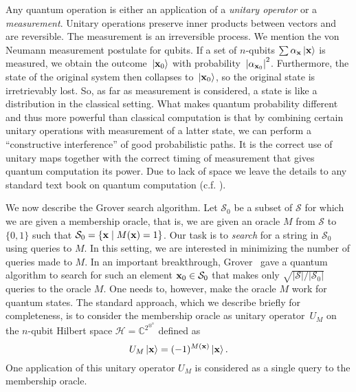 \documentclass[a4paper,11pt]{article}
\begin{document}
Any quantum operation is either an application of a \emph{unitary
  operator} or a \emph{measurement}. Unitary operations preserve inner
products between vectors and are reversible. The measurement is an
irreversible process. We mention the von Neumann measurement postulate
for qubits. If a set of $n$-qubits $\sum \alpha_{\xvec} \ket{\xvec}$
is measured, we obtain the outcome~$\ket{\xvec_0}$ with
probability~$\abs{\alpha_{\xvec_0}}^2$. Furthermore, the state of the
original system then collapses to~$\ket{\xvec_0}$, so the original
state is irretrievably lost. So, as far as measurement is considered,
a state is like a distribution in the classical setting. What makes
quantum probability different and thus more powerful than classical
computation is that by combining certain unitary operations with
measurement of a latter state, we can perform a ``constructive
interference'' of good probabilistic paths. It is the correct use of
unitary maps together with the correct timing of measurement that
gives quantum computation its power. Due to lack of space we leave the
details to any standard text book on quantum computation
(c.f. \cite{nielsenchuang:book}).

We now describe the Grover search algorithm. Let $\mathcal{S}_0$ be a subset of $\mathcal{S}$ for which we are given a membership oracle, that is, we are given an oracle $M$ from $\mathcal{S}$ to $\{ 0 , 1 \}$ such that $\mathcal{S}_0 = \{ \xvec \mid M(\xvec) = 1 \}$. Our task is to \emph{search} for a string in $\mathcal{S}_0$ using queries to $M$. In this setting, we are interested in minimizing the number of queries made to $M$. In an important breakthrough, Grover~\cite{Grover96} gave a quantum algorithm to search for such an element $\xvec_0 \in \mathcal{S}_0$ that makes only $\sqrt{|\mathcal{S}|/|\mathcal{S}_0|}$ queries to the oracle $M$. One needs to, however, make the oracle $M$ work for quantum states. The standard approach, which we describe briefly for completeness, is to consider the membership oracle as unitary operator~$U_M$ on the $n$-qubit Hilbert space $\mathcal{H}= \mathbb{C}^{2^{\otimes^n}}$ defined as
\[
U_M \ket{\xvec} = (-1)^{M(\xvec)} \ket{\xvec}.
\]
One application of this unitary operator $U_M$ is considered as a single query to the membership oracle.
\end{document}
